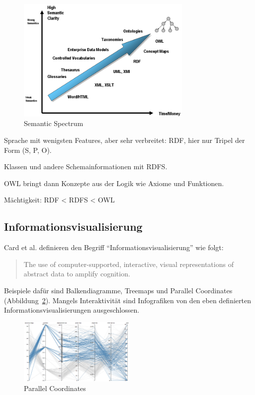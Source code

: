 \documentclass[
	headsepline,
	footsepline,
	fontsize=12pt,
	bibliography=totoc
]{scrbook}
\begin{document}
\begin{figure}[htbp]
	\centering
	\includegraphics[width=0.75\textwidth]{images/grundlagen-semantic_spectrum.png}
	\caption{Semantic Spectrum}
	\label{figure:grundlagen-semantic_spectrum}
\end{figure}

Sprache mit wenigsten Features, aber sehr verbreitet: RDF, hier nur Tripel der Form (S, P, O).

Klassen und andere Schemainformationen mit RDFS.

OWL bringt dann Konzepte aus der Logik wie Axiome und Funktionen.

Mächtigkeit: RDF < RDFS < OWL

\subsection{Informationsvisualisierung}
\label{section:informationsvisualisierung}


Card et al. \cite{Card1999} definieren den Begriff \enquote{Informationsvisualisierung} wie folgt:

\begin{quote}
The use of computer-supported, interactive, visual representations of abstract data to amplify cognition.
\end{quote}

Beispiele dafür sind Balkendiagramme, Treemaps \cite{Shneiderman1992} und Parallel Coordinates \cite{Inselberg1991} (Abbildung~\ref{figure:parallel_coordinates}). Mangels Interaktivität sind Infografiken \cite{Smiciklas2012} von den eben definierten Informationsvisualisierungen ausgeschlossen.

\begin{figure}[htbp]
   \centering
   \includegraphics[width=0.5\textwidth]{images/grundlagen-parallel_coordinates.png} 
   \caption{Parallel Coordinates}
   \label{figure:parallel_coordinates}
\end{figure}
\end{document}
